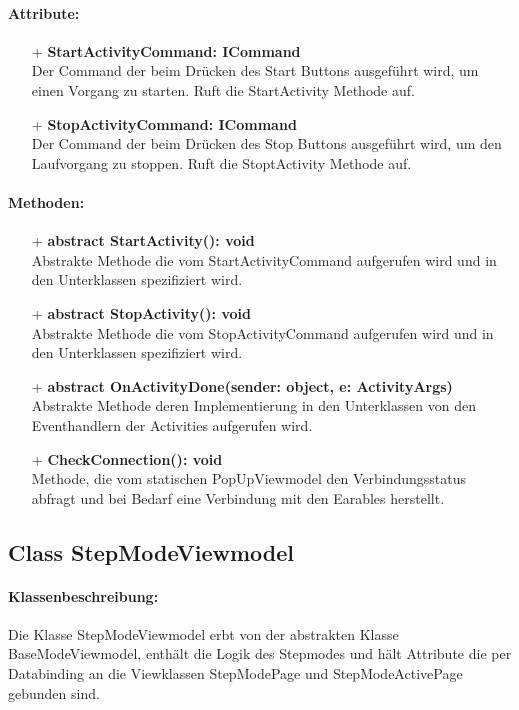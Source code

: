 \documentclass[a4paper,12pt]{article}
\begin{document}
\paragraph{Attribute:}
\begin{itemize}
	\item[+] \textbf{StartActivityCommand: ICommand} \\  Der Command der beim Drücken des Start Buttons ausgeführt wird, um einen Vorgang zu starten. Ruft die StartActivity Methode auf.
	\item[+] \textbf{StopActivityCommand: ICommand} \\ Der Command der beim Drücken des Stop Buttons ausgeführt wird, um den Laufvorgang zu stoppen. Ruft die StoptActivity Methode auf.
\end{itemize} 
\paragraph{Methoden:}
\begin{itemize}
	\item[+] \textbf{abstract StartActivity(): void} \\ Abstrakte Methode die vom StartActivityCommand aufgerufen wird und in den Unterklassen spezifiziert wird.
	\item[+] \textbf{abstract StopActivity(): void} \\ Abstrakte Methode die vom StopActivityCommand aufgerufen wird und in den Unterklassen spezifiziert wird.
	\item[+] \textbf{abstract OnActivityDone(sender: object, e: ActivityArgs)} \\ Abstrakte Methode deren Implementierung in den Unterklassen von den Eventhandlern der Activities aufgerufen wird.
	\item[+] \textbf{CheckConnection(): void} \\ Methode, die vom statischen PopUpViewmodel den Verbindungsstatus abfragt und bei Bedarf eine Verbindung mit den Earables herstellt.
\end{itemize}


\subsection{Class StepModeViewmodel}

\paragraph{Klassenbeschreibung:}
Die Klasse StepModeViewmodel erbt von der abstrakten Klasse BaseModeViewmodel, enthält die Logik des Stepmodes  und hält Attribute die per Databinding an die Viewklassen StepModePage und StepModeActivePage gebunden sind. 
\end{document}
